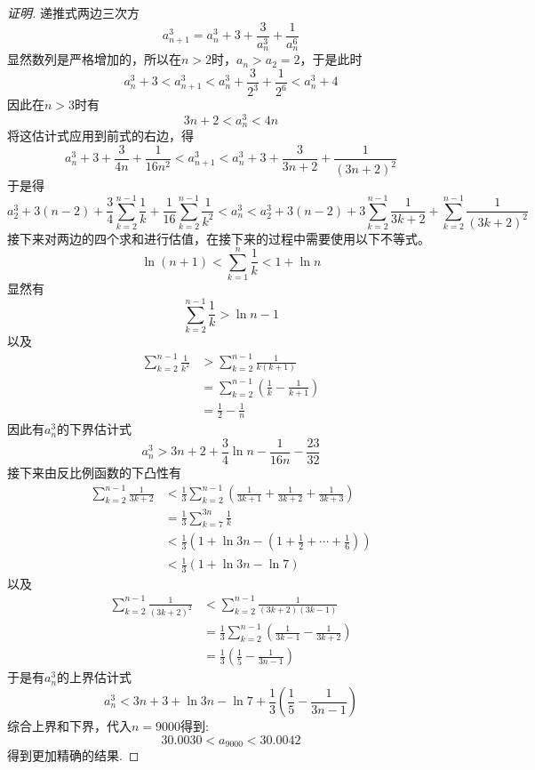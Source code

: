 \begin{proof}[证明]
  递推式两边三次方
  \[ a_{n+1}^3 = a_n^3 + 3 + \frac{3}{a_n^3} + \frac{1}{a_n^6} \]
  显然数列是严格增加的，所以在$n>2$时，$a_n>a_2=2$，于是此时
  \[ a_n^3+3 < a_{n+1}^3 < a_n^3 + \frac{3}{2^3}+\frac{1}{2^6}<a_n^3+4 \]
  因此在$n>3$时有
  \[ 3n+2<a_n^3<4n \]
  将这估计式应用到前式的右边，得
  \[ a_n^3 + 3 + \frac{3}{4n} + \frac{1}{16n^2} < a_{n+1}^3 < a_n^3 + 3 + \frac{3}{3n+2} + \frac{1}{(3n+2)^2} \]
  于是得
  \[ a_2^3 + 3(n-2) + \frac{3}{4}\sum_{k=2}^{n-1} \frac{1}{k} + \frac{1}{16}\sum_{k=2}^{n-1} \frac{1}{k^2} < a_n^3 < a_2^3 + 3(n-2) + 3\sum_{k=2}^{n-1} \frac{1}{3k+2} + \sum_{k=2}^{n-1} \frac{1}{(3k+2)^2} \]
 接下来对两边的四个求和进行估值，在接下来的过程中需要使用以下不等式。
  \[ \ln{(n+1)} < \sum_{k=1}^n \frac{1}{k} < 1 + \ln{n} \]
  显然有
    \[ \sum_{k=2}^{n-1} \frac{1}{k} > \ln{n} - 1 \]
    以及
    \begin{align*}
      \sum_{k=2}^{n-1} \frac{1}{k^2} & > \sum_{k=2}^{n-1} \frac{1}{k(k+1)} \\
                                     & = \sum_{k=2}^{n-1} \left( \frac{1}{k} - \frac{1}{k+1} \right) \\
      & = \frac{1}{2} - \frac{1}{n}
    \end{align*}
    因此有$a_n^3$的下界估计式
    \[ a_n^3 > 3n+2+\frac{3}{4} \ln{n} -\frac{1}{16n} - \frac{23}{32} \]
    接下来由反比例函数的下凸性有
  \begin{align*}
    \sum_{k=2}^{n-1} \frac{1}{3k+2} & < \frac{1}{3} \sum_{k=2}^{n-1} \left( \frac{1}{3k+1} + \frac{1}{3k+2} + \frac{1}{3k+3} \right) \\
                                & = \frac{1}{3} \sum_{k=7}^{3n} \frac{1}{k} \\
                                    & < \frac{1}{3} \left( 1+\ln{3n} - \left( 1+\frac{1}{2}+\cdots+\frac{1}{6} \right) \right) \\
    & < \frac{1}{3} \left( 1+\ln{3n} - \ln{7} \right)
  \end{align*}
  以及
  \begin{align*}
    \sum_{k=2}^{n-1} \frac{1}{(3k+2)^2} & < \sum_{k=2}^{n-1} \frac{1}{(3k+2)(3k-1)} \\
                                        & = \frac{1}{3} \sum_{k=2}^{n-1} \left( \frac{1}{3k-1} - \frac{1}{3k+2} \right) \\
    & = \frac{1}{3} \left( \frac{1}{5} - \frac{1}{3n-1} \right)
  \end{align*}
  于是有$a_n^3$的上界估计式
  \[ a_n^3 < 3n+3 +\ln{3n} - \ln{7} + \frac{1}{3} \left( \frac{1}{5} - \frac{1}{3n-1} \right) \]
  综合上界和下界，代入$n=9000$得到:
  \[ 30.0030 < a_{9000} < 30.0042 \]
 得到更加精确的结果.
 \end{proof}


